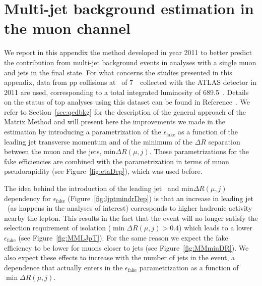 \clearpage{\pagestyle{empty}\cleardoublepage}

\chapter{Multi-jet background estimation in the muon channel}\label{app:qcdmm}

We report in this appendix the method developed in year 2011 to better predict
the contribution from multi-jet background events in analyses with a single
muon and jets in the final state. 
For what concerns the studies presented in this appendix, data
from pp collisions at \cme\ of 7~\tev\ collected with the ATLAS
detector in 2011 are used, corresponding to a total integrated luminosity
of 689.5~\ipb. Details on the status of top analyses
using this dataset can be found in Reference~\cite{topCommonObjects2012}.
We refer to Section~\ref{sec:qcdbkg}
for the description of the general approach of the
Matrix Method and will present here the improvements we
made in the estimation by introducing a parametrization of
the $\epsilon_\mathrm{fake}$ as a function of the leading jet
transverse momentum and of the minimum of the $\Delta R$ separation
between the muon and the jets,  min$\Delta R(\mu,j)$.
These parametrizations for the fake efficiencies 
are combined with the parametrization
in terms of muon pseudorapidity (see Figure~\ref{fig:etaDep}), which was used before.

The idea behind the introduction of the leading jet \pt\ and 
min$\Delta R(\mu,j)$ dependency for $\epsilon_\mathrm{fake}$ 
(Figure~\ref{fig:ljptmindrDep})
is that an increase in leading jet \pt\ (as happens in the
analyses of interest) corresponds 
to higher hadronic activity nearby the lepton.
This results in the fact that the event will no 
longer satisfy the selection requirement of 
isolation ($\min\Delta R(\mu,j)>0.4$) which leads to a lower 
$\epsilon_\mathrm{fake}$ (see Figure~\ref{fig:MMLJpT}). 
For the same reason we expect 
the fake efficiency to be lower for muons closer to jets (see Figure~\ref{fig:MMminDR}).
We also expect these effects to increase with the number of 
jets in the event, a dependence that actually enters
in the $\epsilon_\mathrm{fake}$ parametrization as a function
of $\min\Delta R(\mu,j)$.

